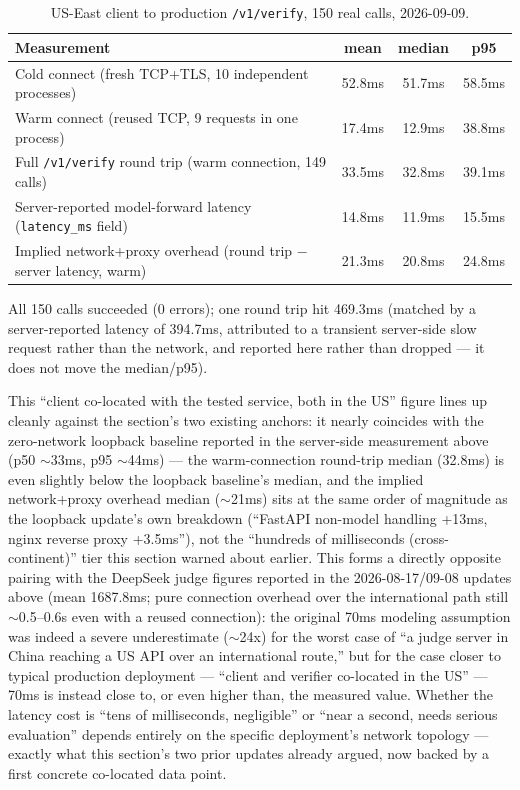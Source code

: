 \documentclass[11pt]{article}
\newenvironment{fittab}{\begin{lrbox}{\fittabbox}}{\end{lrbox}%
  \ifdim\wd\fittabbox>\linewidth\resizebox{\linewidth}{!}{\usebox{\fittabbox}}\else\usebox{\fittabbox}\fi}
\begin{document}
\begin{table}[h]
\centering
\small
\begin{fittab}\begin{tabular}{@{}p{7.6cm}ccc@{}}
\toprule
\textbf{Measurement} & \textbf{mean} & \textbf{median} & \textbf{p95} \\
\midrule
Cold connect (fresh TCP+TLS, 10 independent processes) & 52.8ms & 51.7ms & 58.5ms \\
Warm connect (reused TCP, 9 requests in one process) & 17.4ms & 12.9ms & 38.8ms \\
Full \texttt{/\allowbreak{}v1/\allowbreak{}verify} round trip (warm connection, 149 calls) & 33.5ms & 32.8ms & 39.1ms \\
Server-reported model-forward latency (\texttt{latency\_\allowbreak{}ms} field) & 14.8ms & 11.9ms & 15.5ms \\
Implied network+proxy overhead (round trip $-$ server latency, warm) & 21.3ms & 20.8ms & 24.8ms \\
\bottomrule
\end{tabular}\end{fittab}
\caption{US-East client to production \texttt{/\allowbreak{}v1/\allowbreak{}verify}, 150 real calls, 2026-09-09.}
\end{table}

All 150 calls succeeded (0 errors); one round trip hit 469.3ms (matched by a server-reported latency of 394.7ms, attributed to a transient server-side slow request rather than the network, and reported here rather than dropped --- it does not move the median/p95).

This ``client co-located with the tested service, both in the US'' figure lines up cleanly against the section's two existing anchors: it nearly coincides with the zero-network loopback baseline reported in the server-side measurement above (p50 $\sim$33ms, p95 $\sim$44ms) --- the warm-connection round-trip median (32.8ms) is even slightly below the loopback baseline's median, and the implied network+proxy overhead median ($\sim$21ms) sits at the same order of magnitude as the loopback update's own breakdown (``FastAPI non-model handling +13ms, nginx reverse proxy +3.5ms''), not the ``hundreds of milliseconds (cross-continent)'' tier this section warned about earlier. This forms a directly opposite pairing with the DeepSeek judge figures reported in the 2026-08-17/09-08 updates above (mean 1687.8ms; pure connection overhead over the international path still $\sim$0.5--0.6s even with a reused connection): the original 70ms modeling assumption was indeed a severe underestimate ($\sim$24x) for the worst case of ``a judge server in China reaching a US API over an international route,'' but for the case closer to typical production deployment --- ``client and verifier co-located in the US'' --- 70ms is instead close to, or even higher than, the measured value. Whether the latency cost is ``tens of milliseconds, negligible'' or ``near a second, needs serious evaluation'' depends entirely on the specific deployment's network topology --- exactly what this section's two prior updates already argued, now backed by a first concrete co-located data point.
\end{document}
